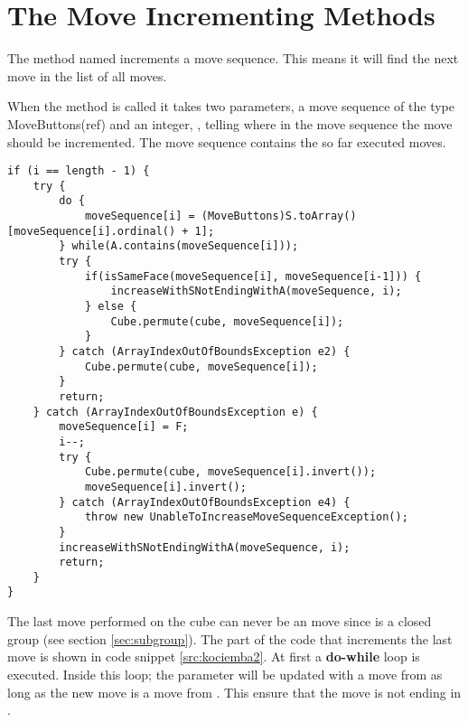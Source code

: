 \section{The Move Incrementing Methods}
\label{sec:increaseWithSNotEndingWithA}
The method named  increments a move sequence. This means it will find the next move in the list of all moves.

When the method is called it takes two parameters, a move sequence of the type MoveButtons(ref) and an integer, , telling where in the move sequence the move should be incremented. The move sequence contains the so far executed moves.





\begin{lstlisting}[style=sourceCode, caption=\myCaption{Key point in the incrementing method of kociemba's optimal solver}, label=src:kociemba2]
if (i == length - 1) {
	try {
		do {
			moveSequence[i] = (MoveButtons)S.toArray()[moveSequence[i].ordinal() + 1];
		} while(A.contains(moveSequence[i]));
		try {
			if(isSameFace(moveSequence[i], moveSequence[i-1])) {
				increaseWithSNotEndingWithA(moveSequence, i);
			} else {
				Cube.permute(cube, moveSequence[i]);
			}
		} catch (ArrayIndexOutOfBoundsException e2) {
			Cube.permute(cube, moveSequence[i]);
		}
		return;
	} catch (ArrayIndexOutOfBoundsException e) {
		moveSequence[i] = F;
		i--;
		try {
			Cube.permute(cube, moveSequence[i].invert());
			moveSequence[i].invert();
		} catch (ArrayIndexOutOfBoundsException e4) {
			throw new UnableToIncreaseMoveSequenceException();
		}
		increaseWithSNotEndingWithA(moveSequence, i);
		return;
	}
}
\end{lstlisting}

The last move performed on the cube can never be an  move since  is a closed group (see section \ref{sec:subgroup}). The part of the code that increments the last move is shown in code snippet \ref{src:kociemba2}.
At first a \textbf{do-while} loop is executed. 
Inside this loop; the parameter  will be updated with a move from  as long as the new move is a move from . This ensure that the move is not ending in .

